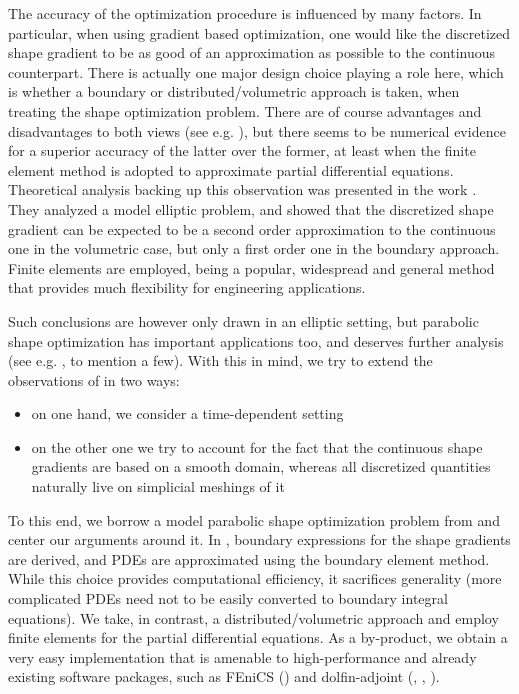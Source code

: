 \documentclass[english,a4paper,9pt,oneside]{scrbook}	%
\theoremstyle{break}
\theoremstyle{remark}
\begin{document}
The accuracy of the optimization procedure is influenced by many factors. In particular, when using gradient based optimization, one would like the discretized shape gradient to be as good of an approximation as possible to the continuous counterpart. There is actually one major design choice playing a role here, which is whether a boundary or distributed/volumetric approach is taken, when treating the shape optimization problem. There are of course advantages and disadvantages to both views (see e.g. \cite{avg_adj}), but there seems to be numerical evidence for a superior accuracy of the latter over the former, at least when the finite element method is adopted to approximate partial differential equations. Theoretical analysis backing up this observation was presented in the work \cite{paganini}. They analyzed a model elliptic problem, and showed that the discretized shape gradient can be expected to be a second order approximation to the continuous one in the volumetric case, but only a first order one in the boundary approach. Finite elements are employed, being a popular, widespread and general method that provides much flexibility for engineering applications.

Such conclusions are however only drawn in an elliptic setting, but parabolic shape optimization has important applications too, and deserves further analysis (see e.g. \cite{lindemann2}, \cite{harbrecht} to mention a few). With this in mind, we try to extend the observations of \cite{paganini} in two ways: 

\begin{itemize}
\item on one hand, we consider a time-dependent setting
\item on the other one we try to account for the fact that the continuous shape gradients are based on a smooth domain, whereas all discretized quantities naturally live on simplicial meshings of it
\end{itemize}

To this end, we borrow a model parabolic shape optimization problem from \cite{harbrecht} and center our arguments around it. In \cite{harbrecht}, boundary expressions for the shape gradients are derived, and PDEs are approximated using the boundary element method. While this choice provides computational efficiency, it sacrifices generality (more complicated PDEs need not to be easily converted to boundary integral equations). We take, in contrast, a distributed/volumetric approach and employ finite elements for the partial differential equations. As a by-product, we obtain a very easy implementation that is amenable to high-performance and already existing software packages, such as FEniCS (\cite{fenics}) and dolfin-adjoint (\cite{dolfin-adjoint_1}, \cite{dolfin-adjoint_2}, \cite{dolfin-adjoint_3}). 
\end{document}
